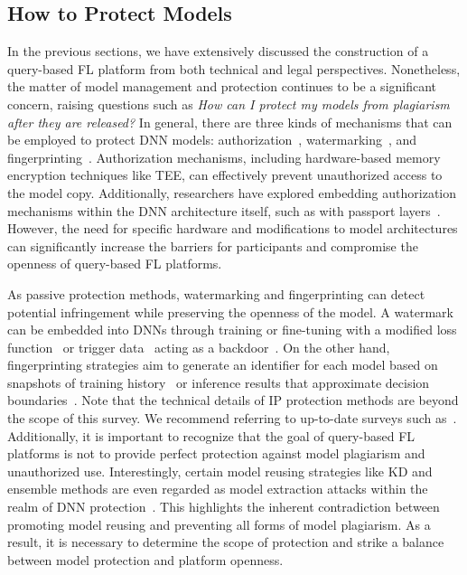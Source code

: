 \subsection{How to Protect Models}
\label{sec:how2protect}
In the previous sections, we have extensively discussed the construction of a query-based FL platform from both technical and legal perspectives. 
Nonetheless, the matter of model management and protection continues to be a significant concern, raising questions such as \textit{How can I protect my models from plagiarism after they are released?}
In general, there are three kinds of mechanisms that can be employed to protect DNN models: authorization~\cite{hanzlik2021mlcapsule}, watermarking~\cite{tekgul2021waffle}, and fingerprinting~\cite{li2023fedipr}.
Authorization mechanisms, including hardware-based memory encryption techniques like TEE, can effectively prevent unauthorized access to the model copy.
Additionally, researchers have explored embedding authorization mechanisms within the DNN architecture itself, such as with passport layers~\cite{fan2019rethinking, zhang2020passport}.
However, the need for specific hardware and modifications to model architectures can significantly increase the barriers for participants and compromise the openness of query-based FL platforms.

As passive protection methods, watermarking and fingerprinting can detect potential infringement while preserving the openness of the model. 
A watermark can be embedded into DNNs through training or fine-tuning with a modified loss function~\cite{uchida2017embedding} or trigger data~\cite{darvish2019deepsigns} acting as a backdoor~\cite{bagdasaryan2020backdoor}.
On the other hand, fingerprinting strategies aim to generate an identifier for each model based on snapshots of training history~\cite{jia2021proof} or inference results that approximate decision boundaries~\cite{chen2022copy}.
Note that the technical details of IP protection methods are beyond the scope of this survey.
We recommend referring to up-to-date surveys such as~\cite{peng2022intellectual, sun2023deep}.
Additionally, it is important to recognize that the goal of query-based FL platforms is not to provide perfect protection against model plagiarism and unauthorized use.
Interestingly, certain model reusing strategies like KD and ensemble methods are even regarded as model extraction attacks within the realm of DNN protection~\cite{charette2022cosine}.
This highlights the inherent contradiction between promoting model reusing and preventing all forms of model plagiarism.
As a result, it is necessary to determine the scope of protection and strike a balance between model protection and platform openness.

